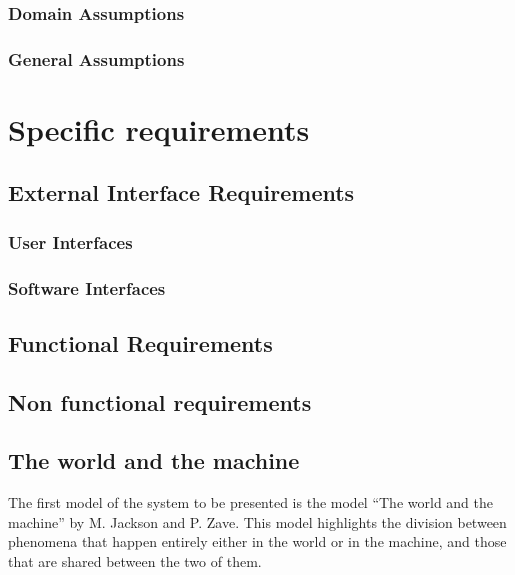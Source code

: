 \documentclass{article}
\begin{document}
\subsubsection{Domain Assumptions}


\subsubsection{General Assumptions}


\clearpage
\section{Specific requirements}

\subsection{External Interface Requirements}

\subsubsection{User Interfaces}

\subsubsection{Software Interfaces}


\subsection{Functional Requirements}


\subsection{Non functional requirements}


\subsection{The world and the machine}
The first model of the system to be presented is the model ``The world and the machine'' by M. Jackson and P. Zave. This model highlights the division between phenomena that happen entirely either in the world or in the machine, and those that are shared between the two of them.
\end{document}

